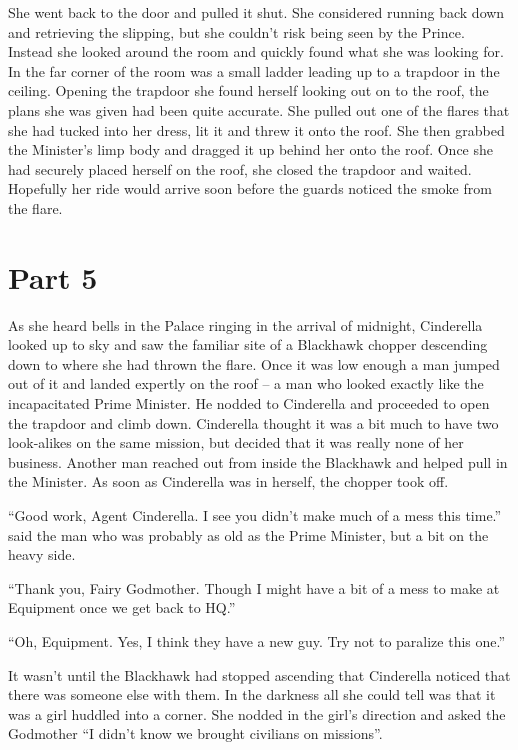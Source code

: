 \documentclass[11pt,letterpaper]{article}
\begin{document}
She went back to the door and pulled it shut. She considered running back down and retrieving the slipping, but she couldn't risk being seen by the Prince. Instead she looked around the room and quickly found what she was looking for. In the far corner of the room was a small ladder leading up to a trapdoor in the ceiling. Opening the trapdoor she found herself looking out on to the roof, the plans she was given had been quite accurate. She pulled out one of the flares that she had tucked into her dress, lit it and threw it onto the roof. She then grabbed the Minister's limp body and dragged it up behind her onto the roof. Once she had securely placed herself on the roof, she closed the trapdoor and waited. Hopefully her ride would arrive soon before the guards noticed the smoke from the flare.

\section*{Part 5}

As she heard bells in the Palace ringing in the arrival of midnight, Cinderella looked up to sky and saw the familiar site of a Blackhawk chopper descending down to where she had thrown the flare. Once it was low enough a man jumped out of it and landed expertly on the roof -- a man who looked exactly like the incapacitated Prime Minister. He nodded to Cinderella and proceeded to open the trapdoor and climb down. Cinderella thought it was a bit much to have two look-alikes on the same mission, but decided that it was really none of her business. Another man reached out from inside the Blackhawk and helped pull in the Minister. As soon as Cinderella was in herself, the chopper took off.

``Good work, Agent Cinderella. I see you didn't make much of a mess this time.'' said the man who was probably as old as the Prime Minister, but a bit on the heavy side.

``Thank you, Fairy Godmother. Though I might have a bit of a mess to make at Equipment once we get back to HQ.''

``Oh, Equipment. Yes, I think they have a new guy. Try not to paralize this one.''

It wasn't until the Blackhawk had stopped ascending that Cinderella noticed that there was someone else with them. In the darkness all she could tell was that it was a girl huddled into a corner. She nodded in the girl's direction and asked the Godmother ``I didn't know we brought civilians on missions''.
\end{document}
